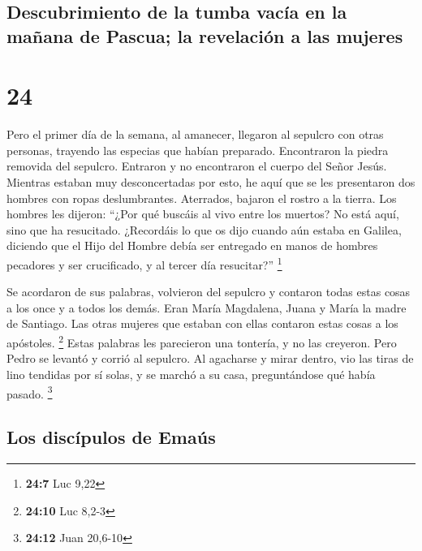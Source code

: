 \hypertarget{descubrimiento-de-la-tumba-vacuxeda-en-la-mauxf1ana-de-pascua-la-revelaciuxf3n-a-las-mujeres}{%
\subsection{Descubrimiento de la tumba vacía en la mañana de Pascua; la
revelación a las
mujeres}\label{descubrimiento-de-la-tumba-vacuxeda-en-la-mauxf1ana-de-pascua-la-revelaciuxf3n-a-las-mujeres}}

\hypertarget{section-23}{%
\section{24}\label{section-23}}

 Pero el primer día de la semana, al amanecer, llegaron al
sepulcro con otras personas, trayendo las especias que habían preparado.
 Encontraron la piedra removida del sepulcro.
 Entraron y no encontraron el cuerpo del Señor Jesús.
 Mientras estaban muy desconcertadas por esto, he aquí que
se les presentaron dos hombres con ropas deslumbrantes. 
Aterrados, bajaron el rostro a la tierra. Los hombres les dijeron:
``¿Por qué buscáis al vivo entre los muertos?  No está
aquí, sino que ha resucitado. ¿Recordáis lo que os dijo cuando aún
estaba en Galilea,  diciendo que el Hijo del Hombre debía
ser entregado en manos de hombres pecadores y ser crucificado, y al
tercer día resucitar?'' \footnote{\textbf{24:7} Luc 9,22}

 Se acordaron de sus palabras,  volvieron
del sepulcro y contaron todas estas cosas a los once y a todos los
demás.  Eran María Magdalena, Juana y María la madre de
Santiago. Las otras mujeres que estaban con ellas contaron estas cosas a
los apóstoles. \footnote{\textbf{24:10} Luc 8,2-3}  Estas
palabras les parecieron una tontería, y no las creyeron. 
Pero Pedro se levantó y corrió al sepulcro. Al agacharse y mirar dentro,
vio las tiras de lino tendidas por sí solas, y se marchó a su casa,
preguntándose qué había pasado. \footnote{\textbf{24:12} Juan 20,6-10}

\hypertarget{los-discuxedpulos-de-emauxfas}{%
\subsection{Los discípulos de
Emaús}\label{los-discuxedpulos-de-emauxfas}}

